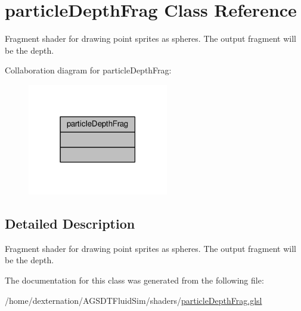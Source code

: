 \hypertarget{classparticle_depth_frag}{\section{particle\-Depth\-Frag Class Reference}
\label{classparticle_depth_frag}
}


Fragment shader for drawing point sprites as spheres. The output fragment will be the depth.  




Collaboration diagram for particle\-Depth\-Frag\-:\nopagebreak
\begin{figure}[H]
\begin{center}
\leavevmode
\includegraphics[width=174pt]{classparticle_depth_frag__coll__graph}
\end{center}
\end{figure}


\subsection{Detailed Description}
Fragment shader for drawing point sprites as spheres. The output fragment will be the depth. 

The documentation for this class was generated from the following file\-:\begin{DoxyCompactItemize}
\item 
/home/dexternation/\-A\-G\-S\-D\-T\-Fluid\-Sim/shaders/\hyperlink{particle_depth_frag_8glsl}{particle\-Depth\-Frag.\-glsl}\end{DoxyCompactItemize}
